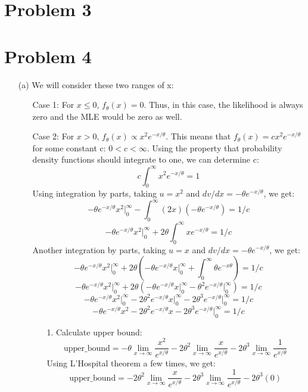 \documentclass[twoside]{homework}
\begin{document}
\section*{Problem 3}


\section*{Problem 4}
\begin{itemize}
    \item[(a)] We will consider these two ranges of x:
    \begin{itemize}
        \item[Case 1:] For $x\leq{0}$, $f_{\theta}(x)=0$. Thus, in this case, the likelihood is always zero and the MLE would be zero as well.
        \item[Case 2:]For $x>0$, $f_{\theta}(x)\propto{x^2}e^{-x/\theta}$. This means that $f_{\theta}(x)=c{x^2}e^{-x/\theta}$ for some constant c: $0<c<\infty$.
        Using the property that probability density functions should integrate to one, we can determine c:
        $$c\int_{0}^{\infty}{x^2}e^{-x/\theta}=1$$ 
        Using integration by parts, taking $u=x^2$ and $dv/dx=-{\theta}e^{-x/\theta}$, we get:
        $$-{\theta}e^{-x/\theta}x^2\Big|_0^{\infty}-\int_{0}^{\infty}(2x)(-{\theta}e^{-x/\theta})=1/c$$ 
        $$-{\theta}e^{-x/\theta}x^2\Big|_0^{\infty}+2\theta\int_{0}^{\infty}xe^{-x/\theta}=1/c$$ 
        Another integration by parts, taking $u=x$ and $dv/dx=-{\theta}e^{-x/\theta}$, we get:
        $$-{\theta}e^{-x/\theta}x^2\Big|_0^{\infty}+2\theta(-{\theta}e^{-x/\theta}x\Big|_0^{\infty}+\int_{0}^{\infty}{\theta}e^{-x\theta})=1/c$$
        $$-{\theta}e^{-x/\theta}x^2\Big|_0^{\infty}+2\theta(-{\theta}e^{-x/\theta}x\Big|_0^{\infty}-{\theta}^2e^{-x/\theta}\Big|_0^{\infty})=1/c$$ 
        $$-{\theta}e^{-x/\theta}x^2\Big|_0^{\infty}-2\theta^2e^{-x/\theta}x\Big|_0^{\infty}-2{\theta}^3e^{-x/\theta}\Big|_0^{\infty}=1/c$$ 
        $$-{\theta}e^{-x/\theta}x^2-2\theta^2e^{-x/\theta}x-2{\theta}^3e^{-x/\theta}\Big|_0^{\infty}=1/c$$ 
        \begin{itemize}
            \item[1.] Calculate upper bound:
            $$\text{upper\_bound}=-\theta\lim_{x\to\infty}\frac{x^2}{e^{x/\theta}}-2\theta^2\lim_{x\to\infty}\frac{x}{e^{x/\theta}}-2{\theta}^3\lim_{x\to\infty}\frac{1}{e^{x/\theta}}$$
            Using L'Hospital theorem a few times, we get:
            $$\text{upper\_bound}=-2\theta^2\lim_{x\to\infty}\frac{x}{e^{x/\theta}}-2\theta^3\lim_{x\to\infty}\frac{1}{e^{x/\theta}}-2\theta^3(0)$$

\end{itemize}
\end{itemize}
\end{itemize}
\end{document}

